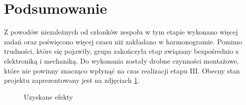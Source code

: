 \documentclass[10pt, a4paper]{article}
\begin{document}
\section{Podsumowanie}
Z powodów niezależnych od członków zespołu w tym etapie wykonano więcej zadań oraz poświęcono więcej czasu niż zakładano w harmonogramie. Pomimo trudności, które się pojawiły, grupa zakończyła etap związany bezpośrednio z elektroniką i mechaniką. Do wykonania zostały drobne czynności montażowe, które nie powinny znacząco wpłynąć na czas realizacji etapu III. Obecny stan projektu zaprezentowany jest na zdjęciach \ref{fig:efekty}.





\begin{figure}[H]
   \centering
    \quad

    \caption{Uzyskane efekty}
    \label{fig:efekty}
   
\end{figure}
\newpage

{}

\nocite{ksiazka1}
\nocite{ksiazka2}
\nocite{gazetka}

\nocite{dok1}
\nocite{dok2}
\nocite{dok3}
\nocite{dok4}
\nocite{dok5}
\nocite{dok6}
\end{document}
